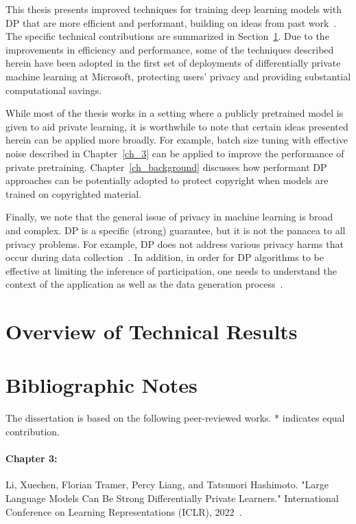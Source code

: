 This thesis presents improved techniques for training deep learning models with DP that are more efficient and performant, building on ideas from past work~\cite{abadi2016deep,tramer2020differentially}.
The specific technical contributions are summarized in Section~\ref{sec:overview_of_results}.
Due to the improvements in efficiency and performance, some of the techniques described herein have been adopted in the first set of deployments of differentially private machine learning at Microsoft, protecting users' privacy and providing substantial computational savings.

While most of the thesis works in a setting where a publicly pretrained model is given to aid private learning, it is worthwhile to note that certain ideas presented herein can be applied more broadly. 
For example, batch size tuning with effective noise described in Chapter~\ref{ch_3} can be applied to improve the performance of private pretraining. 
Chapter~\ref{ch_background} discusses how performant DP approaches can be potentially adopted to protect copyright when models are trained on copyrighted material.

Finally, we note that the general issue of privacy in machine learning is broad and complex.
DP is a specific (strong) guarantee, but it is not the panacea to all privacy problems.
For example, DP does not address various privacy harms that occur during data collection~\cite{solove2005taxonomy}.
In addition, in order for DP algorithms to be effective at limiting the inference of participation, one needs to understand the context of the application as well as the data generation process~\cite{kifer2011no}.

\section{Overview of Technical Results}\label{sec:overview_of_results}

\newpage
\section*{Bibliographic Notes}

The dissertation is based on the following peer-reviewed works.
* indicates equal contribution.

\paragraph{Chapter 3:} 
Li, Xuechen, Florian Tramer, Percy Liang, and Tatsunori Hashimoto. "Large Language Models Can Be Strong Differentially Private Learners." International Conference on Learning Representations (ICLR), 2022~\cite{li2022large}.

